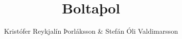 \author{Kristófer Reykjalín Þorláksson \& Stefán Óli Valdimarsson}  %
\title{Boltaþol}  %

\graphicspath{{graphics/}{Graphics/}{./}}

\usepackage[backend=biber, bibencoding=utf8, style=ieee]{biblatex}



\usepackage[final,hidelinks]{hyperref} %


\usepackage{gensymb}


%

\newcommand{\sbr}{sbr.\xspace}
\newcommand{\te}{þ.e.\xspace}